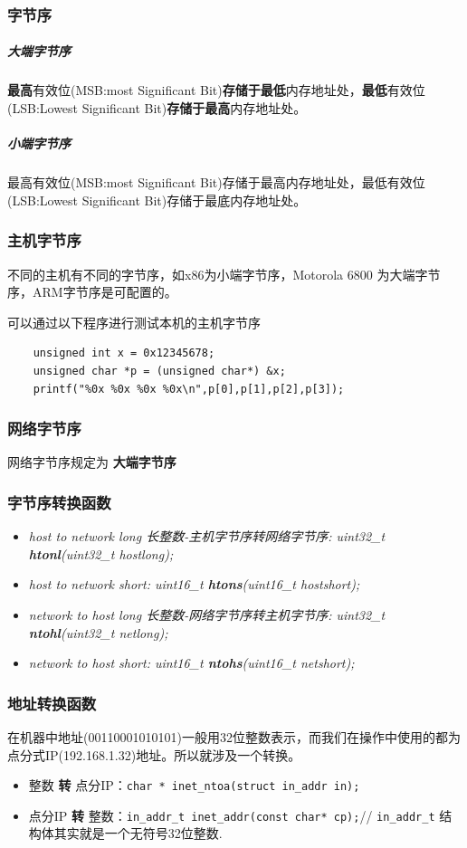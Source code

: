 \documentclass[UTF8,a4paper,8pt]{ctexbook}
\begin{document}
			\subsubsection{字节序}
				\subparagraph{大端字节序}
					\textbf{最高}有效位(MSB:most Significant Bit)\textbf{存储于最低}内存地址处，\textbf{最低}有效位(LSB:Lowest Significant Bit)\textbf{存储于最高}内存地址处。
					
				\subparagraph{小端字节序}
					最高有效位(MSB:most Significant Bit)存储于最高内存地址处，最低有效位(LSB:Lowest Significant Bit)存储于最底内存地址处。
			\subsubsection{主机字节序}
				不同的主机有不同的字节序，如x86为小端字节序，Motorola 6800 为大端字节序，ARM字节序是可配置的。
				
				可以通过以下程序进行测试本机的主机字节序
				\begin{lstlisting}
	unsigned int x = 0x12345678;
	unsigned char *p = (unsigned char*) &x;
	printf("%0x %0x %0x %0x\n",p[0],p[1],p[2],p[3]);				 
				\end{lstlisting}
			\subsubsection{网络字节序}网络字节序规定为 \textbf{大端字节序}
			
			\subsubsection{字节序转换函数}
				\begin{itemize}
					\item \textit{host to network long 长整数-主机字节序转网络字节序: uint32\_t \textbf{htonl}(uint32\_t hostlong);}
					\item \textit{host to network short:  uint16\_t \textbf{htons}(uint16\_t hostshort);}
					\item \textit{network to host long 长整数-网络字节序转主机字节序:  uint32\_t \textbf{ntohl}(uint32\_t netlong);}
					\item \textit{network to host short:  uint16\_t \textbf{ntohs}(uint16\_t netshort);}
				\end{itemize}
				
			\subsubsection{地址转换函数}
				在机器中地址(00110001010101)一般用32位整数表示，而我们在操作中使用的都为点分式IP(192.168.1.32)地址。所以就涉及一个转换。
				\begin{itemize}
					\item 整数 \textbf{转} 点分IP：\verb|char * inet_ntoa(struct in_addr in);|
					\item 点分IP \textbf{转} 整数：\verb|in_addr_t inet_addr(const char* cp);|// \verb|in_addr_t| 结构体其实就是一个无符号32位整数.
				\end{itemize}
			
\end{document}
